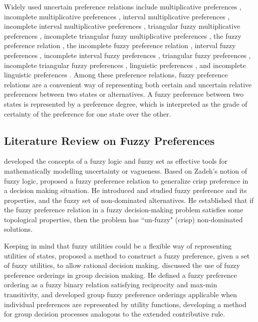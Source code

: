 Widely used uncertain preference relations include multiplicative preferences \citep{Saaty1980, Herrera-et-al2001}, incomplete multiplicative preferences \citep{Harker1987, Nishizawa1997}, interval multiplicative preferences \citep{Islam-et-al1997, Xu2005a}, incomplete interval multiplicative preferences \citep{Xu2006}, triangular fuzzy multiplicative preferences \citep{Chang1996, Mikhailov2003}, incomplete triangular fuzzy multiplicative preferences \citep{Xu2006}, the fuzzy preference relation \citep{Orlovsky1978, Tanino1984, Tanino1988, Chiclana-et-al2001, Xu2007}, the incomplete fuzzy preference relation \citep{Herrera-Viedma-et-al2007, Xu2005b}, interval fuzzy preferences \citep{Jiang2007, Xu2004b}, incomplete interval fuzzy preferences \citep{Xu2006}, triangular fuzzy preferences \citep{Xu2002}, incomplete triangular fuzzy preferences \citep{Xu2006}, linguistic preferences \citep{Herrera&Herrera-Viedma2000, Xu2004a}, and incomplete linguistic preferences \citep{Alonso-et-al2009, Xu2005c}. Among these preference relations, fuzzy preference relations are a convenient way of representing both certain and uncertain relative preferences between two states or alternatives. A fuzzy preference between two states is represented by a preference degree, which is interpreted as the grade of certainty of the preference for one state over the other.


\subsection{Literature Review on Fuzzy Preferences}


\citet{Zadeh1965, Zadeh1973} developed the concepts of a fuzzy logic and fuzzy set as effective tools for mathematically modelling uncertainty or vagueness. Based on Zadeh's notion of fuzzy logic, \citet{Orlovsky1978} proposed a fuzzy preference relation to generalize crisp preference in a decision making situation. He introduced and studied fuzzy preference and its properties, and the fuzzy set of non-dominated alternatives. He established that if the fuzzy preference relation in a fuzzy decision-making problem satisfies some topological properties, then the problem has ``un-fuzzy" (crisp) non-dominated solutions.

Keeping in mind that fuzzy utilities could be a flexible way of representing utilities of states, \citet{Nakamura1986} proposed a method to construct a fuzzy preference, given a set of fuzzy utilities, to allow rational decision making. \citet{Tanino1984} discussed the use of fuzzy preference orderings in group decision making. He defined a fuzzy preference ordering as a fuzzy binary relation satisfying reciprocity and max-min transitivity, and developed group fuzzy preference orderings applicable when individual preferences are represented by utility functions, developing a method for group decision processes analogous to the extended contributive rule.

